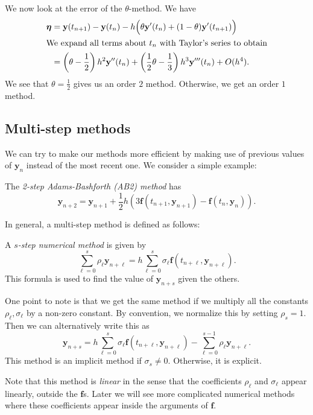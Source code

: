 \documentclass[a4paper]{article}
\begin{document}
We now look at the error of the $\theta$-method. We have
\begin{align*}
  \boldsymbol\eta &= \mathbf{y}(t_{n + 1}) - \mathbf{y}(t_n) - h \Big(\theta \mathbf{y}'(t_n) + (1 - \theta)\mathbf{y}'(t_{n + 1})\Big)\\
  \intertext{We expand all terms about $t_n$ with Taylor's series to obtain}
  &= \left(\theta - \frac{1}{2}\right) h^2 \mathbf{y}''(t_n) + \left(\frac{1}{2}\theta - \frac{1}{3}\right) h^3 \mathbf{y}'''(t_n) + O(h^4).
\end{align*}
We see that $\theta = \frac{1}{2}$ gives us an order $2$ method. Otherwise, we get an order $1$ method.

\subsection{Multi-step methods}
We can try to make our methods more efficient by making use of previous values of $\mathbf{y}_n$ instead of the most recent one. We consider a simple example:
\begin{defi}
  The \emph{2-step Adams-Bashforth (AB2) method} has
  \[
    \mathbf{y}_{n + 2} = \mathbf{y}_{n + 1} + \frac{1}{2}h \left(3 \mathbf{f}(t_{n + 1}, \mathbf{y}_{n + 1}) - \mathbf{f}(t_n, \mathbf{y}_n)\right).
  \]
\end{defi}

In general, a multi-step method is defined as follows:
\begin{defi}
  A \emph{$s$-step numerical method} is given by
  \[
    \sum_{\ell = 0}^s \rho_\ell \mathbf{y}_{n + \ell} = h \sum_{ \ell = 0}^s \sigma_\ell \mathbf{f}(t_{n + \ell}, \mathbf{y}_{n + \ell}).
  \]
  This formula is used to find the value of $\mathbf{y}_{n + s}$ given the others.
\end{defi}
One point to note is that we get the same method if we multiply all the constants $\rho_\ell, \sigma_\ell$ by a non-zero constant. By convention, we normalize this by setting $\rho_s = 1$. Then we can alternatively write this as
\[
  \mathbf{y}_{n + s} = h \sum_{\ell = 0}^s \sigma_\ell \mathbf{f}(t_{n + \ell}, \mathbf{y}_{n + \ell}) - \sum_{\ell = 0}^{s - 1} \rho_\ell \mathbf{y}_{n + \ell}.
\]
This method is an implicit method if $\sigma_s \not= 0$. Otherwise, it is explicit.

Note that this method is \emph{linear} in the sense that the coefficients $\rho_\ell$ and $\sigma_\ell$ appear linearly, outside the $\mathbf{f}$s. Later we will see more complicated numerical methods where these coefficients appear inside the arguments of $\mathbf{f}$.
\end{document}
